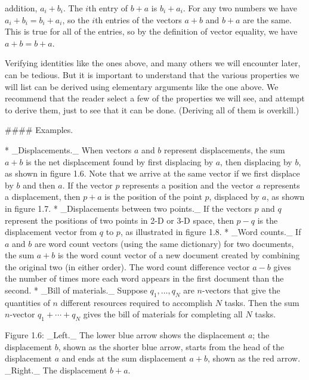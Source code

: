 addition, \(a_{i}+b_{i}\). The \(i\)th entry of \(b+a\) is \(b_{i}+a_{i}\). For any two numbers we have \(a_{i}+b_{i}=b_{i}+a_{i}\), so the \(i\)th entries of the vectors \(a+b\) and \(b+a\) are the same. This is true for all of the entries, so by the definition of vector equality, we have \(a+b=b+a\).

Verifying identities like the ones above, and many others we will encounter later, can be tedious. But it is important to understand that the various properties we will list can be derived using elementary arguments like the one above. We recommend that the reader select a few of the properties we will see, and attempt to derive them, just to see that it can be done. (Deriving all of them is overkill.)

#### Examples.

* _Displacements._ When vectors \(a\) and \(b\) represent displacements, the sum \(a+b\) is the net displacement found by first displacing by \(a\), then displacing by \(b\), as shown in figure 1.6. Note that we arrive at the same vector if we first displace by \(b\) and then \(a\). If the vector \(p\) represents a position and the vector \(a\) represents a displacement, then \(p+a\) is the position of the point \(p\), displaced by \(a\), as shown in figure 1.7.
* _Displacements between two points._ If the vectors \(p\) and \(q\) represent the positions of two points in 2-D or 3-D space, then \(p-q\) is the displacement vector from \(q\) to \(p\), as illustrated in figure 1.8.
* _Word counts._ If \(a\) and \(b\) are word count vectors (using the same dictionary) for two documents, the sum \(a+b\) is the word count vector of a new document created by combining the original two (in either order). The word count difference vector \(a-b\) gives the number of times more each word appears in the first document than the second.
* _Bill of materials._ Suppose \(q_{1},\ldots,q_{N}\) are \(n\)-vectors that give the quantities of \(n\) different resources required to accomplish \(N\) tasks. Then the sum \(n\)-vector \(q_{1}+\cdots+q_{N}\) gives the bill of materials for completing all \(N\) tasks.

Figure 1.6: _Left._ The lower blue arrow shows the displacement \(a\); the displacement \(b\), shown as the shorter blue arrow, starts from the head of the displacement \(a\) and ends at the sum displacement \(a+b\), shown as the red arrow. _Right._ The displacement \(b+a\).

 